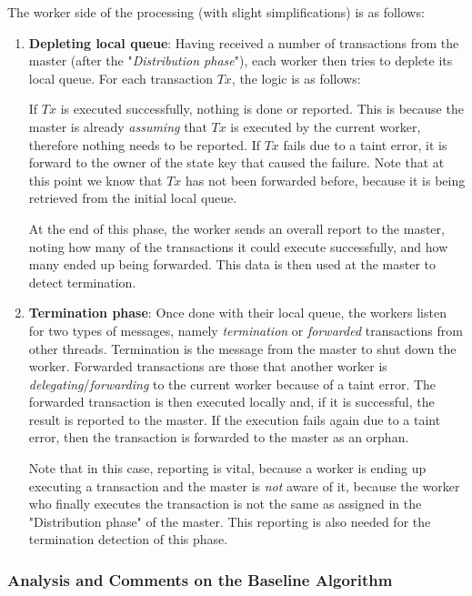 The worker side of the processing (with slight simplifications) is as follows:

\begin{enumerate}
    \item \textbf{Depleting local queue}: Having received a number of transactions from the master
    (after the "\textit{Distribution phase}"), each worker then tries to deplete its local queue.
    For each transaction $Tx$, the logic is as follows:

    If $Tx$ is executed successfully, nothing is done or reported. This is because the master is
    already \textit{assuming} that $Tx$ is executed by the current worker, therefore nothing needs
    to be reported. If $Tx$ fails due to a taint error, it is forward to the owner of the state key
    that caused the failure. Note that at this point we know that $Tx$ has not been forwarded
    before, because it is being retrieved from the initial local queue.

    At the end of this phase, the worker sends an overall report to the master, noting how many of
    the transactions it could execute successfully, and how many ended up being forwarded. This data
    is then used at the master to detect termination.

    \item \textbf{Termination phase}: Once done with their local queue, the workers listen for two
    types of messages, namely \textit{termination} or \textit{forwarded} transactions from other
    threads. Termination is the message from the master to shut down the worker. Forwarded
    transactions are those that another worker is \textit{delegating}/\textit{forwarding} to the
    current worker because of a taint error. The forwarded transaction is then executed locally and,
    if it is successful, the result is reported to the master. If the execution fails again due to a
    taint error, then the transaction is forwarded to the master as an orphan.

    Note that in this case, reporting is vital, because a worker is ending up executing a
    transaction and the master is \textit{not} aware of it, because the worker who finally executes
    the transaction is not the same as assigned in the "Distribution phase" of the master. This
    reporting is also needed for the termination detection of this phase.
\end{enumerate}

\subsubsection{Analysis and Comments on the Baseline Algorithm}
\label{chap_approach:subsec:comment_baseline}

